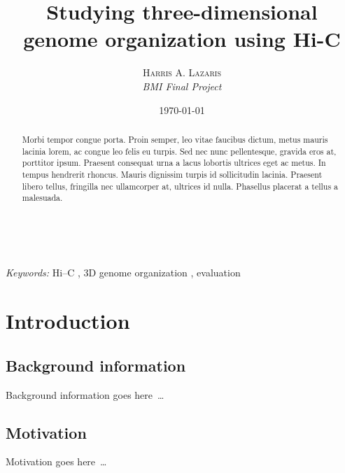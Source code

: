 \documentclass[a4paper, 11pt]{article} %
\title{\textbf{Studying three-dimensional genome organization using Hi-C}}\\ %
\author{\textsc{Harris A. Lazaris}\\ %
{\textit{BMI Final Project}}} %
\date{\today} %
\makeatletter
\renewcommand{\maketitle}{ %
\begin{flushright} %
{\LARGE\@title} %

\vspace{50pt} %

{\large\@author} %
\\\@date %

\vspace{40pt} %
\end{flushright}
}
\makeatother
\begin{document}
\maketitle %


\renewcommand{\abstractname}{Summary} %

\begin{abstract}
Morbi tempor congue porta. Proin semper, leo vitae faucibus dictum, metus mauris lacinia lorem, ac congue leo felis eu turpis. Sed nec nunc pellentesque, gravida eros at, porttitor ipsum. Praesent consequat urna a lacus lobortis ultrices eget ac metus. In tempus hendrerit rhoncus. Mauris dignissim turpis id sollicitudin lacinia. Praesent libero tellus, fringilla nec ullamcorper at, ultrices id nulla. Phasellus placerat a tellus a malesuada.
\end{abstract}

\hspace*{3,6mm}\textit{Keywords:} Hi--C , 3D genome organization , evaluation  %

\vspace{30pt} %


\section*{Introduction}

\subsection*{Background information}

Background information goes here~\ldots

\subsection*{Motivation}

Motivation goes here~\ldots
\end{document}
